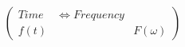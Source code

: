 \documentclass[preview]{standalone}
\begin{document}
\begin{align*}
\left( \begin{array}{cl} Time & \Longleftrightarrow Frequency \\ f(t) & & F(\omega) \end{array} \right)
\end{align*}
\end{document}
